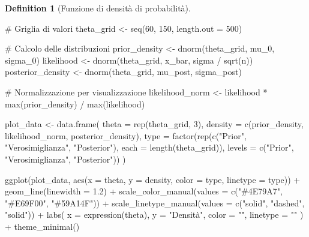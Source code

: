 \documentclass[
  letterpaper,
  DIV=11,
  numbers=noendperiod,
  oneside]{scrreprt}
\newenvironment{Shaded}{\begin{snugshade}}{\end{snugshade}}
\newcommand{\AttributeTok}[1]{\textcolor[rgb]{0.40,0.45,0.13}{#1}}
\newcommand{\CommentTok}[1]{\textcolor[rgb]{0.37,0.37,0.37}{#1}}
\newcommand{\DecValTok}[1]{\textcolor[rgb]{0.68,0.00,0.00}{#1}}
\newcommand{\FloatTok}[1]{\textcolor[rgb]{0.68,0.00,0.00}{#1}}
\newcommand{\FunctionTok}[1]{\textcolor[rgb]{0.28,0.35,0.67}{#1}}
\newcommand{\NormalTok}[1]{\textcolor[rgb]{0.00,0.23,0.31}{#1}}
\newcommand{\OtherTok}[1]{\textcolor[rgb]{0.00,0.23,0.31}{#1}}
\newcommand{\SpecialCharTok}[1]{\textcolor[rgb]{0.37,0.37,0.37}{#1}}
\newcommand{\StringTok}[1]{\textcolor[rgb]{0.13,0.47,0.30}{#1}}
\theoremstyle{definition}
\theoremstyle{plain}
\theoremstyle{definition}
\newtheorem{definition}{Definition}[chapter]
\theoremstyle{remark}
\begin{document}
\begin{definition}[Funzione di densità di
probabilità]
\begin{Shaded}
\begin{Highlighting}[]
\CommentTok{\# Griglia di valori}
\NormalTok{theta\_grid }\OtherTok{\textless{}{-}} \FunctionTok{seq}\NormalTok{(}\DecValTok{60}\NormalTok{, }\DecValTok{150}\NormalTok{, }\AttributeTok{length.out =} \DecValTok{500}\NormalTok{)}

\CommentTok{\# Calcolo delle distribuzioni}
\NormalTok{prior\_density }\OtherTok{\textless{}{-}} \FunctionTok{dnorm}\NormalTok{(theta\_grid, mu\_0, sigma\_0)}
\NormalTok{likelihood }\OtherTok{\textless{}{-}} \FunctionTok{dnorm}\NormalTok{(theta\_grid, x\_bar, sigma }\SpecialCharTok{/} \FunctionTok{sqrt}\NormalTok{(n))}
\NormalTok{posterior\_density }\OtherTok{\textless{}{-}} \FunctionTok{dnorm}\NormalTok{(theta\_grid, mu\_post, sigma\_post)}

\CommentTok{\# Normalizzazione per visualizzazione}
\NormalTok{likelihood\_norm }\OtherTok{\textless{}{-}}\NormalTok{ likelihood }\SpecialCharTok{*} \FunctionTok{max}\NormalTok{(prior\_density) }\SpecialCharTok{/} \FunctionTok{max}\NormalTok{(likelihood)}

\NormalTok{plot\_data }\OtherTok{\textless{}{-}} \FunctionTok{data.frame}\NormalTok{(}
  \AttributeTok{theta =} \FunctionTok{rep}\NormalTok{(theta\_grid, }\DecValTok{3}\NormalTok{),}
  \AttributeTok{density =} \FunctionTok{c}\NormalTok{(prior\_density, likelihood\_norm, posterior\_density),}
  \AttributeTok{type =} \FunctionTok{factor}\NormalTok{(}\FunctionTok{rep}\NormalTok{(}\FunctionTok{c}\NormalTok{(}\StringTok{"Prior"}\NormalTok{, }\StringTok{"Verosimiglianza"}\NormalTok{, }\StringTok{"Posterior"}\NormalTok{), }\AttributeTok{each =} \FunctionTok{length}\NormalTok{(theta\_grid)),}
                \AttributeTok{levels =} \FunctionTok{c}\NormalTok{(}\StringTok{"Prior"}\NormalTok{, }\StringTok{"Verosimiglianza"}\NormalTok{, }\StringTok{"Posterior"}\NormalTok{))}
\NormalTok{)}

\FunctionTok{ggplot}\NormalTok{(plot\_data, }\FunctionTok{aes}\NormalTok{(}\AttributeTok{x =}\NormalTok{ theta, }\AttributeTok{y =}\NormalTok{ density, }\AttributeTok{color =}\NormalTok{ type, }\AttributeTok{linetype =}\NormalTok{ type)) }\SpecialCharTok{+}
  \FunctionTok{geom\_line}\NormalTok{(}\AttributeTok{linewidth =} \FloatTok{1.2}\NormalTok{) }\SpecialCharTok{+}
  \FunctionTok{scale\_color\_manual}\NormalTok{(}\AttributeTok{values =} \FunctionTok{c}\NormalTok{(}\StringTok{"\#4E79A7"}\NormalTok{, }\StringTok{"\#E69F00"}\NormalTok{, }\StringTok{"\#59A14F"}\NormalTok{)) }\SpecialCharTok{+}
  \FunctionTok{scale\_linetype\_manual}\NormalTok{(}\AttributeTok{values =} \FunctionTok{c}\NormalTok{(}\StringTok{"solid"}\NormalTok{, }\StringTok{"dashed"}\NormalTok{, }\StringTok{"solid"}\NormalTok{)) }\SpecialCharTok{+}
  \FunctionTok{labs}\NormalTok{(}
    \AttributeTok{x =} \FunctionTok{expression}\NormalTok{(theta),}
    \AttributeTok{y =} \StringTok{"Densità"}\NormalTok{,}
    \AttributeTok{color =} \StringTok{""}\NormalTok{,}
    \AttributeTok{linetype =} \StringTok{""}
\NormalTok{  ) }\SpecialCharTok{+}
  \FunctionTok{theme\_minimal}\NormalTok{() }
\end{Highlighting}
\end{Shaded}


\end{definition}
\end{document}
